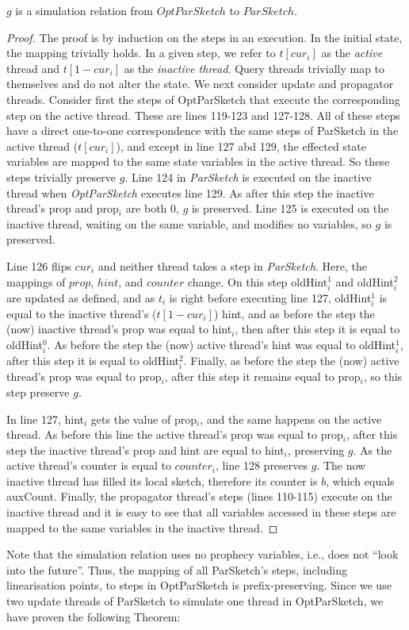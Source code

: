 \begin{lemma}
    $g$ is a simulation relation from $OptParSketch$ to $ParSketch$.
\end{lemma}
\begin{proof}
The proof is by induction on the steps in an execution. In the initial state, the mapping trivially holds.
In a given step, we refer to $t[{cur_i}]$ as the \emph{active} thread and $t[1-cur_i]$ as the \emph{inactive thread}. 
Query threads trivially map to themselves and do not alter the state. We next consider update and propagator threads. 
Consider first the steps of OptParSketch that execute the corresponding step on the active thread.
These are lines 119-123 and 127-128.
All of these steps have a direct one-to-one correspondence with the same steps of ParSketch in the
active thread ($t[cur_i]$), and except in line 127 abd 129, the effected state variables are mapped to the
same state variables in the active thread. So these steps trivially preserve $g$.
Line 124 in \emph{ParSketch} is executed on the inactive thread when \emph{OptParSketch} executes line 129. As after
this step the inactive thread's prop and prop$_i$ are both 0, $g$ is preserved. 
Line 125 is executed on the inactive thread, waiting on the same variable, and modifies no variables, so $g$ is preserved.

Line 126 flips $cur_i$ and neither thread takes a step in \emph{ParSketch}. Here, the mappings of $prop$, $hint$, and $counter$ change. 
On this step oldHint$_i^1$ and oldHint$_i^2$ are updated as defined, and as $t_i$ is right before
executing line 127, oldHint$_i^1$ is equal to the inactive thread's ($t[1-cur_i]$) hint, and as before the step the (now)
inactive thread's prop was equal to hint$_i$, then after this step it is equal to oldHint$_i^0$.
As before the step the (now) active thread's hint was equal to oldHint$_i^1$, after this step it is equal to oldHint$_i^2$. Finally,
as before the step the (now) active thread's prop was equal to prop$_i$, after this step it remains equal to prop$_i$, so this
step preserve $g$.

In line 127, hint$_i$ gets the value of prop$_i$, and the same happens on the active thread. As before this line the
active thread's prop was equal to prop$_i$, after this step the inactive thread's prop and hint are equal to hint$_i$,
preserving $g$.
As the active thread's counter is equal to $counter_i$, line 128 preserves $g$.
The now inactive thread has filled its local sketch, therefore its counter is $b$, which equals
auxCount.  
Finally, the propagator thread’s steps (lines 110-115) execute on the inactive
thread and it is easy to see that all variables accessed in these steps are mapped to the same variables in the inactive thread. 
\end{proof}

Note that the simulation relation uses no prophecy variables, i.e., does not ``look into the future''.
Thus, the mapping of all ParSketch’s steps, including linearisation points,  to steps in OptParSketch is prefix-preserving.
Since we use two update threads of ParSketch to simulate one thread in OptParSketch, we have proven the following Theorem:
\optgenereicstrong*